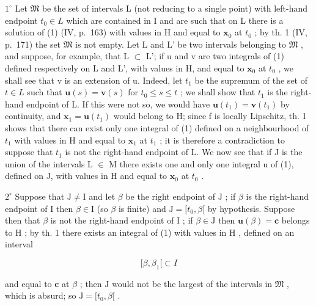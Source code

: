 \(1^{\circ}\) Let \(\mathfrak{M}\) be the set of intervals L (not reducing to a single point) with left-hand endpoint \(t_0 \in L\) which are contained in I and are such that on L there is a solution of (1) (IV, p.~163) with values in H and equal to \(\mathbf{x}_0\) at \(t_0\) ; by th. 1 (IV, p.~171) the set \(\mathfrak{M}\) is not empty. Let L and L' be two intervals belonging to \(\mathfrak{M}\) , and suppose, for example, that L \(\subset\) L'; if u and v are two integrals of (1) defined respectively on L and L', with values in H, and equal to \(\mathbf{x}_0\) at \(t_0\) , we shall see that v is an extension of u. Indeed, let \(t_1\) be the supremum of the set of \(t \in L\) such that \(\mathbf{u}(s) = \mathbf{v}(s)\) for \(t_0 \leqslant s \leqslant t\) ; we shall show that \(t_1\) is the right-hand endpoint of L. If this were not so, we would have \(\mathbf{u}(t_1) = \mathbf{v}(t_1)\) by continuity, and \(\mathbf{x}_1 = \mathbf{u}(t_1)\) would belong to H; since f is locally Lipschitz, th. 1 shows that there can exist only one integral of (1) defined on a neighbourhood of \(t_1\) with values in H and equal to \(\mathbf{x}_1\) at \(t_1\) ; it is therefore a contradiction to suppose that \(t_1\) is not the right-hand endpoint of L. We now see that if J is the union of the intervals L \(\in\) M there exists one and only one integral u of (1), defined on J, with values in H and equal to \(\mathbf{x}_0\) at \(t_0\) .

\(2^{\circ}\) Suppose that \(\mathrm{J} \neq \mathrm{I}\) and let \(\beta\) be the right endpoint of \(\mathrm{J}\) ; if \(\beta\) is the right-hand endpoint of \(\mathrm{I}\) then \(\beta \in \mathrm{I}\) (so \(\beta\) is finite) and \(\mathrm{J} = [t_0, \beta[\) by hypothesis. Suppose then that \(\beta\) is not the right-hand endpoint of \(\mathrm{I}\) ; if \(\beta \in \mathrm{J}\) then \(\mathbf{u}(\beta) = \mathbf{c}\) belongs to \(\mathrm{H}\) ; by th. 1 there exists an integral of (1) with values in \(\mathrm{H}\) , defined on an interval

\[
[ \beta , \beta_ {1} [ \subset I
\]

and equal to \(\mathbf{c}\) at \(\beta\) ; then \(\mathrm{J}\) would not be the largest of the intervals in \(\mathfrak{M}\) , which is absurd; so \(\mathrm{J} = [t_0, \beta[\) .

